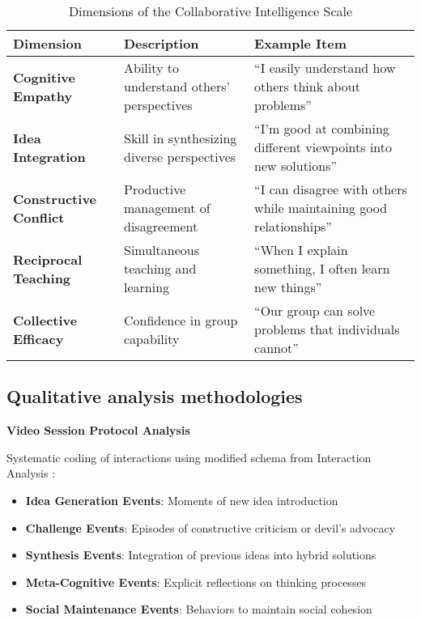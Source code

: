 \begin{table}[ht]
\centering
\caption{Dimensions of the Collaborative Intelligence Scale}
\label{tab:cis-dimensions}
\begin{tabular}{p{3cm}p{5cm}p{4.5cm}}
\toprule
\textbf{Dimension} & \textbf{Description} & \textbf{Example Item} \\
\midrule
\textbf{Cognitive Empathy} & Ability to understand others' perspectives & ``I easily understand how others think about problems'' \\
\hline
\textbf{Idea Integration} & Skill in synthesizing diverse perspectives & ``I'm good at combining different viewpoints into new solutions'' \\
\hline  
\textbf{Constructive Conflict} & Productive management of disagreement & ``I can disagree with others while maintaining good relationships'' \\
\hline
\textbf{Reciprocal Teaching} & Simultaneous teaching and learning & ``When I explain something, I often learn new things'' \\
\hline
\textbf{Collective Efficacy} & Confidence in group capability & ``Our group can solve problems that individuals cannot'' \\
\bottomrule
\end{tabular}
\end{table}

\subsection{Qualitative analysis methodologies}

\textbf{Video Session Protocol Analysis}

Systematic coding of interactions using modified schema from Interaction Analysis \cite{Jordan1995}:
\begin{itemize}
    \item \textbf{Idea Generation Events}: Moments of new idea introduction
    \item \textbf{Challenge Events}: Episodes of constructive criticism or devil's advocacy
    \item \textbf{Synthesis Events}: Integration of previous ideas into hybrid solutions
    \item \textbf{Meta-Cognitive Events}: Explicit reflections on thinking processes
    \item \textbf{Social Maintenance Events}: Behaviors to maintain social cohesion
\end{itemize}

